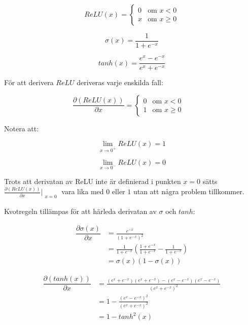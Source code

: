 \documentclass[a4paper,11pt,twoside]{article}
\newcommand*{\pd}[2]{\ensuremath{\dfrac{\partial #1}{\partial #2}}}
\newcommand*{\inpd}[2]{\ensuremath{\frac{\partial #1}{\partial #2}}}
\begin{document}
\begin{equation}
ReLU(x) = \begin{cases} 
			0 & \mbox{om } x < 0 \\ 
			x & \mbox{om } x \geq 0 
		\end{cases}
\end{equation}

\begin{equation}
\sigma(x) = \frac{1}{1+e^{-x}}
\end{equation}

\begin{equation}
tanh(x) = \frac{e^x-e^{-x}}{e^x+e^{-x}}
\end{equation}

För att derivera $ReLU$ deriveras varje enskilda fall:

\begin{equation}
\pd{(ReLU(x))}{x} = \begin{cases} 
			0 & \mbox{om } x < 0 \\ 
			1 & \mbox{om } x \geq 0 
		\end{cases} \quad
\end{equation}

Notera att:

\begin{equation}
\lim_{x\to 0^+} ReLU(x) = 1
\end{equation}

\begin{equation}
\lim_{x\to 0^-} ReLU(x) = 0
\end{equation}

Trots att derivatan av ReLU inte är definierad i punkten $x = 0$ sätts $\inpd{(ReLU(x))}{x}|_{\substack{x=0}}$ vara lika med $0$ eller $1$ utan att några problem tillkommer. \cite{cs231n} 


Kvotregeln tillämpas för att härleda derivatan av $\sigma$ och $tanh$:

\begin{equation}
\begin{split}
\pd{\sigma(x)}{x} 	& = \frac{e^{-x}}{(1+e^{-x})^2} \\
					& = \frac{1}{1+e^{-x}}(\frac{1+e^{-x}}{1+e^{-x}}-\frac{1}{1+e^{-x}})\\
			 		& = \sigma(x)(1-\sigma(x))
\end{split}
\end{equation}

\begin{equation}
\begin{split}
\pd{(tanh(x))}{x} 	& = \frac{(e^x+e^{-x})(e^x+e^{-x})-(e^x-e^{-x})(e^x-e^{-x})}{(e^x+e^{-x})^2} \\
					& = 1 - \frac{(e^x-e^{-x})^2}{(e^x+e^{-x})^2} \\
			 		& = 1 - {tanh}^2(x)
\end{split}
\end{equation}
\end{document}
